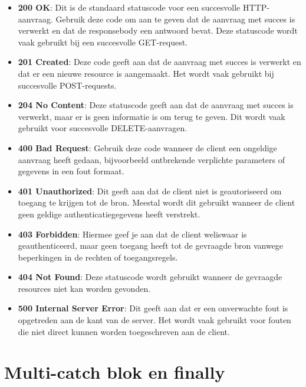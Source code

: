\begin{itemize}

\item \textbf{200 OK}: Dit is de standaard statuscode voor een succesvolle HTTP-aanvraag. Gebruik deze code om aan te geven dat de aanvraag met succes is verwerkt en dat de responsebody een antwoord bevat.  Deze statuscode wordt vaak gebruikt bij een succesvolle GET-request.

\item \textbf{201 Created}: Deze code geeft aan dat de aanvraag met succes is verwerkt en dat er een nieuwe resource is aangemaakt. Het wordt vaak gebruikt bij succesvolle POST-requests.

\item \textbf{204 No Content}: Deze statuscode geeft aan dat de aanvraag met succes is verwerkt, maar er is geen informatie is om terug te geven. Dit wordt vaak gebruikt voor succesvolle DELETE-aanvragen.

\item \textbf{400 Bad Request}: Gebruik deze code wanneer de client een ongeldige aanvraag heeft gedaan, bijvoorbeeld ontbrekende verplichte parameters of gegevens in een fout formaat.

\item \textbf{401 Unauthorized}: Dit geeft aan dat de client niet is geautoriseerd om toegang te krijgen tot de bron.  Meestal wordt dit gebruikt wanneer de client geen geldige authenticatiegegevens heeft verstrekt.

\item \textbf{403 Forbidden}: Hiermee geef je aan dat de client weliswaar is geauthenticeerd, maar geen toegang heeft tot de gevraagde bron vanwege beperkingen in de rechten of toegangsregels.

\item \textbf{404 Not Found}: Deze statuscode wordt gebruikt wanneer de gevraagde resources niet kan worden gevonden.

\item \textbf{500 Internal Server Error}: Dit geeft aan dat er een onverwachte fout is opgetreden aan de kant van de server. Het wordt vaak gebruikt voor fouten die niet direct kunnen worden toegeschreven aan de client.
\end{itemize}

\section{Multi-catch blok en finally}

